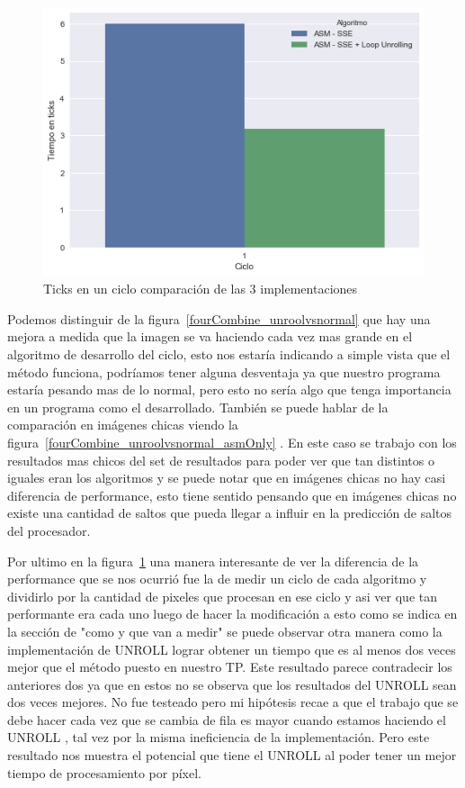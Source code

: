 \begin{figure}[H]
	\centering
	\includegraphics[scale=0.5]{img/fourCombine_ticks_en_ciclo.png}
	\caption{Ticks en un ciclo comparación de las 3 implementaciones}
	\label{fourCombine_ticksciclo}
\end{figure}

Podemos distinguir de la figura~\ref{fourCombine_unroolvsnormal} que hay una mejora a medida que la imagen se va haciendo cada vez mas grande en el algoritmo de desarrollo del ciclo, esto nos estaría indicando a simple vista que el método funciona, podríamos tener alguna desventaja ya que nuestro programa estaría pesando mas de lo normal, pero esto no sería algo que tenga importancia en un programa como el desarrollado. También se puede hablar de la comparación en imágenes chicas viendo la figura~\ref{fourCombine_unroolvsnormal_asmOnly} . En este caso se trabajo con los resultados mas chicos del set de resultados para poder ver que tan distintos o iguales eran los algoritmos y se puede notar que en imágenes chicas no hay casi diferencia de performance, esto tiene sentido pensando que en imágenes chicas no existe una cantidad de saltos que pueda llegar a influir en la predicción de saltos del procesador.

Por ultimo en la figura~\ref{fourCombine_ticksciclo} una manera interesante de ver la diferencia de la performance que se nos ocurrió fue la de medir un ciclo de cada algoritmo y dividirlo por la cantidad de pixeles que procesan en ese ciclo y asi ver que tan performante era cada uno luego de hacer la modificación a esto como se indica en la sección de "como y que van a medir" se puede observar otra manera como la implementación de UNROLL lograr obtener un tiempo que es al menos dos veces mejor que el método puesto en nuestro TP. Este resultado parece contradecir los anteriores dos ya que en estos no se observa que los resultados del UNROLL sean dos veces mejores. No fue testeado pero mi hipótesis recae a que el trabajo que se debe hacer cada vez que se cambia de fila es mayor cuando estamos haciendo el UNROLL , tal vez por la misma ineficiencia de la implementación. Pero este resultado nos muestra el potencial que tiene el UNROLL al poder tener un mejor tiempo de procesamiento por píxel.

